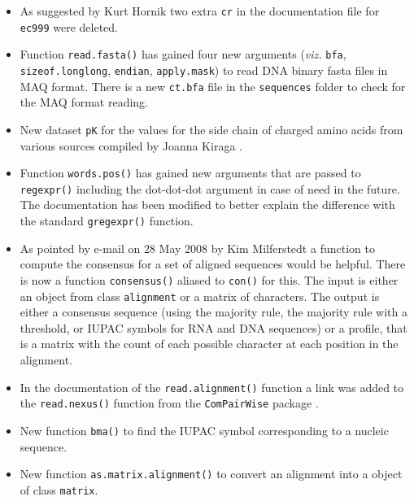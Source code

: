 \documentclass{article}
\begin{document}
\begin{itemize}

\item As suggested by Kurt Hornik two extra \texttt{cr} in the
  documentation file for \texttt{ec999} were deleted.

\item Function \texttt{read.fasta()} has gained four new arguments
  (\textit{viz.} \texttt{bfa}, \texttt{sizeof.longlong},
  \texttt{endian}, \texttt{apply.mask}) to read DNA binary fasta
  files in MAQ format. There is a new \texttt{ct.bfa} file
  in the \texttt{sequences} folder to check for the MAQ format
  reading.

\item New dataset \texttt{pK} for the values for the side chain of 
  charged amino acids from various sources compiled by Joanna Kiraga
  \cite{KiragaJ2008}.

\item Function \texttt{words.pos()} has gained new arguments that
  are passed to \texttt{regexpr()} including the dot-dot-dot
  argument in case of need in the future. The documentation has
  been modified to better explain the difference with the standard
  \texttt{gregexpr()} function.

\item As pointed by e-mail on 28 May 2008 by Kim Milferstedt a
  function to compute the consensus for a set of aligned sequences
  would be helpful. There is now a function \texttt{consensus()}
  aliased to \texttt{con()} for this. The input is either an object
  from class \texttt{alignment} or a matrix of characters. The
  output is either a consensus sequence (using the majority rule,
  the majority rule with a threshold, or IUPAC symbols for RNA
  and DNA sequences) or a profile, that is a matrix with the count 
  of each possible character at each position in the alignment.

\item In the documentation of the \texttt{read.alignment()} function
  a link was added to the \texttt{read.nexus()} function from the
  \texttt{ComPairWise} package \cite{ComPairWise}.

\item New function \texttt{bma()} to find the IUPAC symbol corresponding
  to a nucleic sequence.

\item New function \texttt{as.matrix.alignment()} to convert an
  alignment into a object of class \texttt{matrix}.


\end{itemize}
\end{document}
